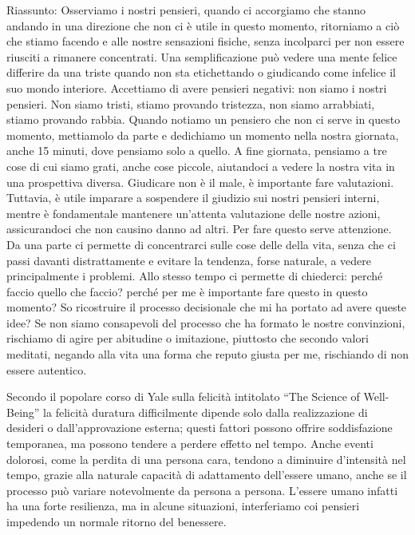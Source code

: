 \documentclass[12pt]{book} %
\begin{document}
\begin{mdframed}[linewidth=1pt]
Riassunto: Osserviamo i nostri pensieri, quando ci accorgiamo che stanno andando in una direzione che non ci è utile in questo momento, ritorniamo a ciò che stiamo facendo e alle nostre sensazioni fisiche, senza incolparci per non essere riusciti a rimanere concentrati. Una semplificazione può vedere una mente felice differire da una triste quando non sta etichettando o giudicando come infelice il suo mondo interiore. Accettiamo di avere pensieri negativi: non siamo i nostri pensieri. Non siamo tristi, stiamo provando tristezza, non siamo arrabbiati, stiamo provando rabbia. 
Quando notiamo un pensiero che non ci serve in questo momento, mettiamolo da parte e dedichiamo un momento nella nostra giornata, anche 15 minuti, dove pensiamo solo a quello. A fine giornata, pensiamo a tre cose di cui siamo grati, anche cose piccole, aiutandoci a vedere la nostra vita in una prospettiva diversa.
Giudicare non è il male, è importante fare valutazioni. Tuttavia, è utile imparare a sospendere il giudizio sui nostri pensieri interni, mentre è fondamentale mantenere un'attenta valutazione delle nostre azioni, assicurandoci che non causino danno ad altri.
Per fare questo serve attenzione. Da una parte ci permette di concentrarci sulle cose delle della vita, senza che ci passi davanti distrattamente e evitare la tendenza, forse naturale, a vedere principalmente i problemi. Allo stesso tempo ci permette di chiederci: perché faccio quello che faccio? perché per me è importante fare questo in questo momento? So ricostruire il processo decisionale che mi ha portato ad avere queste idee? Se non siamo consapevoli del processo che ha formato le nostre convinzioni, rischiamo di agire per abitudine o imitazione, piuttosto che secondo valori meditati, negando alla vita una forma che reputo giusta per me, rischiando di non essere autentico.
\end{mdframed}

Secondo il popolare corso di Yale sulla felicità intitolato “The Science of Well-Being” la felicità duratura difficilmente dipende solo dalla realizzazione di desideri o dall’approvazione esterna; questi fattori possono offrire soddisfazione temporanea, ma possono tendere a perdere effetto nel tempo. Anche eventi dolorosi, come la perdita di una persona cara, tendono a diminuire d’intensità nel tempo, grazie alla naturale capacità di adattamento dell’essere umano, anche se il processo può variare notevolmente da persona a persona. L'essere umano infatti ha una forte resilienza, ma in alcune situazioni, interferiamo coi pensieri impedendo un normale ritorno del benessere.  
\end{document}

